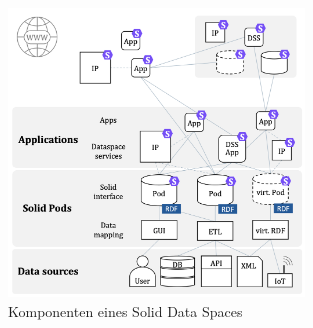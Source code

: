 \begin{figure}
    \centering
    \includegraphics[width=0.7\textwidth]{../shared/assets/meckler_sds_components.png}
    \caption{Komponenten eines Solid Data Spaces~\cite{mecklerWebLinkedData2023}}
\end{figure}

